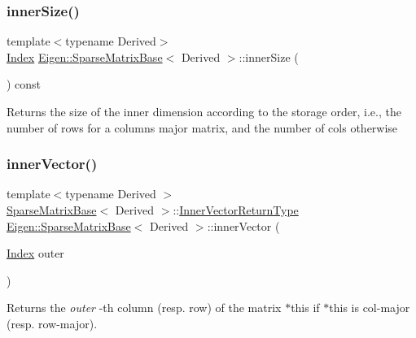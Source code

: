 \subsubsection{\texorpdfstring{innerSize()}{innerSize()}}
{\footnotesize\ttfamily template$<$typename Derived$>$ \\
\mbox{\hyperlink{struct_eigen_1_1_eigen_base_a554f30542cc2316add4b1ea0a492ff02}{Index}} \mbox{\hyperlink{class_eigen_1_1_sparse_matrix_base}{Eigen\+::\+Sparse\+Matrix\+Base}}$<$ Derived $>$\+::inner\+Size (\begin{DoxyParamCaption}{ }\end{DoxyParamCaption}) const\hspace{0.3cm}{\ttfamily [inline]}}

\begin{DoxyReturn}{Returns}
the size of the inner dimension according to the storage order, i.\+e., the number of rows for a columns major matrix, and the number of cols otherwise 
\end{DoxyReturn}
\mbox{\label{class_eigen_1_1_sparse_matrix_base_a65aaf3b50d205011e2bfa0de24756cce}} 
\subsubsection{\texorpdfstring{innerVector()}{innerVector()}\hspace{0.1cm}{\footnotesize\ttfamily [1/2]}}
{\footnotesize\ttfamily template$<$typename Derived $>$ \\
\mbox{\hyperlink{class_eigen_1_1_sparse_matrix_base}{Sparse\+Matrix\+Base}}$<$ Derived $>$\+::\mbox{\hyperlink{class_eigen_1_1_block}{Inner\+Vector\+Return\+Type}} \mbox{\hyperlink{class_eigen_1_1_sparse_matrix_base}{Eigen\+::\+Sparse\+Matrix\+Base}}$<$ Derived $>$\+::inner\+Vector (\begin{DoxyParamCaption}\item[{\mbox{\hyperlink{struct_eigen_1_1_eigen_base_a554f30542cc2316add4b1ea0a492ff02}{Index}}}]{outer }\end{DoxyParamCaption})}

\begin{DoxyReturn}{Returns}
the {\itshape outer} -\/th column (resp. row) of the matrix {\ttfamily $\ast$this} if {\ttfamily $\ast$this} is col-\/major (resp. row-\/major). 
\end{DoxyReturn}
\mbox{\label{class_eigen_1_1_sparse_matrix_base_a1050a842569fcdadf8d936250301e72d}} 
